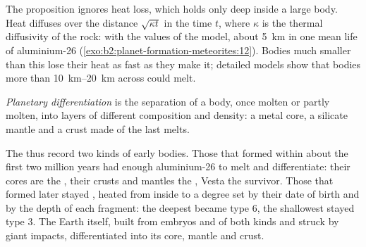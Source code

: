 \begin{omfigure}
\par{}
\end{omfigure}

The proposition ignores heat loss, which holds only deep inside a large body.
Heat diffuses over the distance $\sqrt{\kappa t}$ in the time $t$, where
$\kappa$ is the thermal diffusivity of the rock: with the values of the model,
about \qty{5}{km} in one mean life of aluminium-26 (\cref{exo:b2:planet-formation-meteorites:12}). Bodies much
smaller than this lose their heat as fast as they make it; detailed models show
that bodies more than \qtyrange{10}{20}{km} across could melt.

\begin{definition}
\label{def:b2:planet-formation-meteorites:differentiation}
\emph{Planetary differentiation} is the
separation of a body, once molten or partly molten, into layers of different
composition and density: a metal core, a silicate mantle and a crust made of
the last melts.
\end{definition}

The  thus record two kinds of early bodies. Those that formed within
about the first two million years had enough aluminium-26 to melt and
differentiate: their cores are the , their crusts and mantles
the , Vesta the survivor. Those that formed later stayed
, heated from inside to a degree set by their date of birth and by
the depth of each fragment: the deepest became type 6, the shallowest stayed
type 3. The Earth itself, built from embryos and  of both kinds and
struck by giant impacts, differentiated into its core, mantle and crust.


